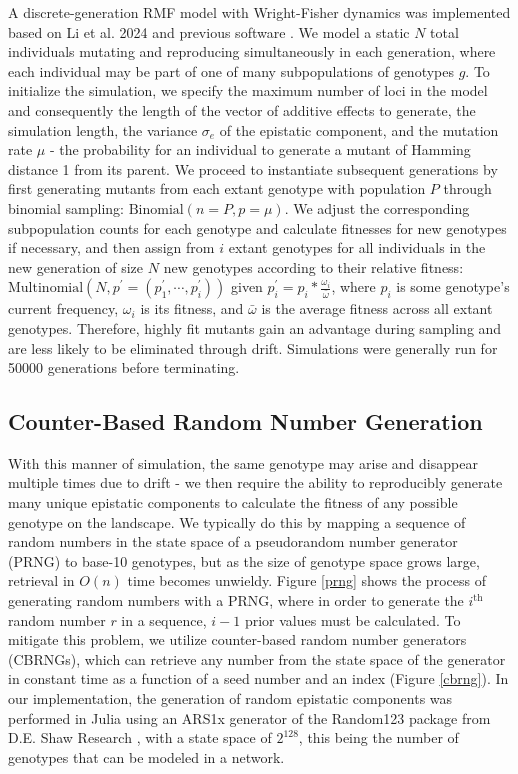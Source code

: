 \documentclass[paper=a4, fontsize=11pt,twoside]{scrartcl}       %
\begin{document}
A discrete-generation RMF model with Wright-Fisher dynamics was implemented based on Li et al. 2024 \cite{liRapidAdaptationRecombining2024} and previous software \cite{amadoSTUNForwardtimeSimulation2023}. We model a static $N$ total individuals mutating and reproducing simultaneously in each generation, where each individual may be part of one of many subpopulations of genotypes $g$. To initialize the simulation, we specify the maximum number of loci in the model and consequently the length of the vector of additive effects to generate, the simulation length, the variance $\sigma_e$ of the epistatic component, and the mutation rate $\mu$ - the probability for an individual to generate a mutant of Hamming distance 1 from its parent. We proceed to instantiate subsequent generations by first generating mutants from each extant genotype with population $P$ through binomial sampling: $\text{Binomial}(n = P, p = \mu)$. We adjust the corresponding subpopulation counts for each genotype and calculate fitnesses for new genotypes if necessary, and then assign from $i$ extant genotypes for all individuals in the new generation of size $N$ new genotypes according to their relative fitness: $\text{Multinomial}(N, p^{\prime} = (p^{\prime}_1, \cdots, p^{\prime}_i))$ given $p^{\prime}_i = p_i * \frac{\omega_i}{\bar{\omega}}$, where $p_i$ is some genotype's current frequency, $\omega_i$ is its fitness, and $\bar{\omega}$ is the average fitness across all extant genotypes. Therefore, highly fit mutants gain an advantage during sampling and are less likely to be eliminated through drift. Simulations were generally run for 50000 generations before terminating.

\subsection*{Counter-Based Random Number Generation}

With this manner of simulation, the same genotype may arise and disappear multiple times due to drift - we then require the ability to reproducibly generate many unique epistatic components to calculate the fitness of any possible genotype on the landscape. We typically do this by mapping a sequence of random numbers in the state space of a pseudorandom number generator (PRNG) to base-10 genotypes, but as the size of genotype space grows large, retrieval in $O(n)$ time becomes unwieldy. Figure \ref{prng} shows the process of generating random numbers with a PRNG, where in order to generate the $i^{\text{th}}$ random number $r$ in a sequence, $i-1$ prior values must be calculated. To mitigate this problem, we utilize counter-based random number generators (CBRNGs), which can retrieve any number from the state space of the generator in constant time as a function of a seed number and an index (Figure \ref{cbrng}). In our implementation, the generation of random epistatic components was performed in Julia using an ARS1x generator \cite{JuliaRandomRandom123jl2024} of the Random123 package from D.E. Shaw Research \cite{salmonParallelRandomNumbers2011}, with a state space of $2^{128}$, this being the number of genotypes that can be modeled in a network.
\end{document}
